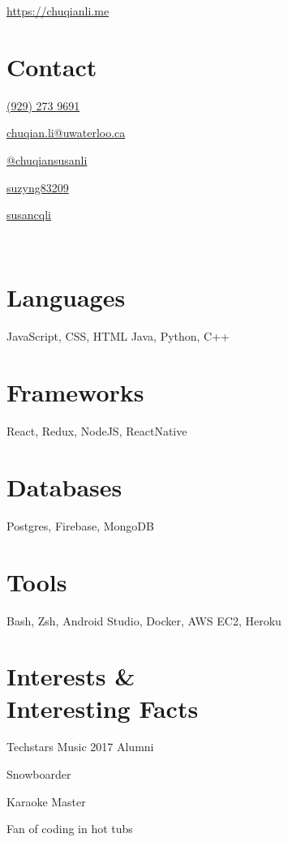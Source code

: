 \documentclass[]{friggeri-cv}
\begin{document}
       {\href{http://chuqianli.me}{https://chuqianli.me}}


\begin{aside}
  \section{Contact}
  \begin{description}\raggedleft
	  \item \href{tel:19292739691}{(929) 273 9691 \textcolor{red}{\faPhone}}
	  \item \href{mailto:chuqian.li@edu.uwaterloo.ca}{chuqian.li@uwaterloo.ca \textcolor{red}{\faEnvelopeO}}
	  \item \href{https://medium.com/@chuqiansusanli}{@chuqiansusanli \textcolor{red}{\faMedium}}
	  \item \href{https://github.com/suzyng83209}{suzyng83209 \textcolor{red}{\faGithub}}
	  \item \href{https://www.linkedin.com/in/susancqli}{susancqli \textcolor{red}{\faLinkedin}}
  \end{description}
  \
  \section{Languages}
  JavaScript, CSS, HTML
  Java, Python, C++
  \section{Frameworks}
  React, Redux, NodeJS, ReactNative
  \section{Databases}
  Postgres, Firebase, MongoDB
  \section{Tools}
  Bash, Zsh, Android Studio, Docker, AWS EC2, Heroku
  \
  \section{Interests \& \\ \vspace*{0.1cm}Interesting Facts}
  \begin{description}\raggedleft
  	\item Techstars Music 2017 Alumni
  	\item Snowboarder
  	\item Karaoke Master
  	\item Fan of coding in hot tubs
  \end{description}
	\

\end{aside}
\end{document}
